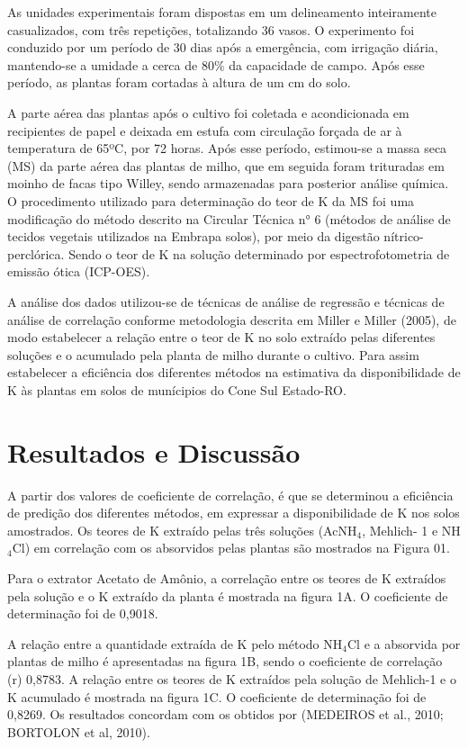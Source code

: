 \documentclass[article,12pt,onesidea,4paper,english,brazil]{abntex2}
\begin{document}
	As unidades experimentais foram dispostas em um delineamento inteiramente casualizados, com três repetições, totalizando 36 vasos. O experimento foi conduzido por um período de 30 dias após a emergência, com irrigação diária, mantendo-se a umidade a cerca de 80\% da capacidade de campo. Após esse período, as plantas foram cortadas à altura de um cm do solo.

	A parte aérea das plantas após o cultivo foi coletada e acondicionada em recipientes de papel e deixada em estufa com circulação forçada de ar à temperatura de 65ºC, por 72 horas. Após esse período, estimou-se a massa seca (MS) da parte aérea das plantas de milho, que em seguida foram trituradas em moinho de facas tipo Willey, sendo armazenadas para posterior análise química. O procedimento utilizado para determinação do teor de K da MS foi uma modificação do método descrito na Circular Técnica n° 6 (métodos de análise de tecidos vegetais utilizados na Embrapa solos), por meio da digestão nítrico-perclórica. Sendo o teor de K na solução determinado por espectrofotometria de emissão ótica (ICP-OES).
	
	A análise dos dados utilizou-se de técnicas de análise de regressão e técnicas de análise de correlação conforme metodologia descrita em Miller e Miller (2005), de modo estabelecer a relação entre o teor de K no solo extraído pelas diferentes soluções e o acumulado pela planta de milho durante o cultivo. Para assim estabelecer a eficiência dos diferentes métodos na estimativa da disponibilidade de K às plantas em solos de munícipios do Cone Sul Estado-RO.
	
	\section*{Resultados e Discussão}
	
	A partir dos valores de coeficiente de correlação, é que se determinou a eficiência de predição dos diferentes métodos, em expressar a disponibilidade de K nos solos amostrados. Os teores de K extraído pelas três soluções (AcNH$_4$, Mehlich- 1 e NH$_4$Cl) em correlação com os absorvidos pelas plantas são mostrados na Figura 01.
	
	Para o extrator Acetato de Amônio, a correlação entre os teores de K extraídos pela solução e o K extraído da planta é mostrada na figura 1A. O coeficiente de determinação foi de 0,9018.
	
	A relação entre a quantidade extraída de K pelo método NH$_4$Cl e a absorvida por plantas de milho é apresentadas na figura 1B, sendo o coeficiente de correlação (r) 0,8783. A relação entre os teores de K extraídos pela solução de Mehlich-1 e o K acumulado é mostrada na figura 1C. O coeficiente de determinação foi de 0,8269. Os resultados concordam com os obtidos por (MEDEIROS et al., 2010; BORTOLON
	et al, 2010).
	
\end{document}
